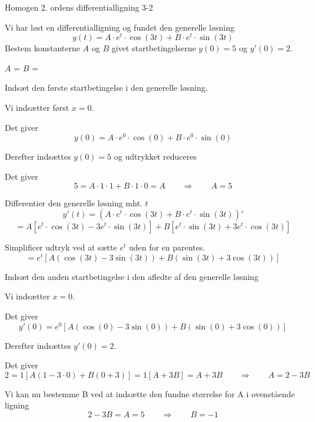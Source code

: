 \documentclass{article}
\begin{document}
\newpage

\begin{exercise}{Homogen 2. ordens differentialligning 3-2}

Vi har løst en differentialligning og fundet den generelle løsning
\[
y(t) = A \cdot e^{t} \cdot \cos(3 t)+ B \cdot e^{t} \cdot \sin(3 t)
\]
Bestem konstanterne $A$ og $B$ givet startbetingelserne $y(0)=5$ og $y'(0)=2$.


$A$ = 
$B$ = 

\hint

Indsæt den første startbetingelse i den generelle løsning.


\hint

Vi indsætter først $x=0$.

\hint

Det giver
\[
y(0)= A \cdot e^{0} \cdot \cos(0)+ B \cdot e^{0} \cdot \sin(0)
\]

\hint

Derefter indsættes $y(0)=5$ og udtrykket reduceres

\hint

Det giver
\[
5= A \cdot 1 \cdot 1+ B \cdot 1 \cdot 0 = A \qquad \Rightarrow \qquad A = 5
\]

\hint

Differentier den generelle løsning mht. $t$
\[
y'(t) = \left(A \cdot e^{ t} \cdot \cos(3 t)+ B \cdot e^{t} \cdot \sin(3t)\right)'
\]
\[
= A \left[e^{t} \cdot \cos(3t) - 3e^{t} \cdot \sin(3t) \right] + B \left[e^{t} \cdot \sin(3t) + 3e^{t} \cdot \cos(3t) \right]
\]

\hint

Simplificer udtryk ved at sætte $e^{t}$ uden for en parentes.
\[
= e^{t} \left[ A (\cos(3t)-3\sin(3t)) + B (\sin(3t) + 3\cos(3t)) \right]
\]

\hint

Indsæt den anden startbetingelse i den afledte af den generelle løsning

\hint

Vi indsætter $x=0$.

\hint

Det giver
\[
y'(0) = e^{0} \left[ A (\cos(0)-3 \sin(0)) + B (\sin(0) + 3 \cos(0)) \right]
\]

\hint

Derefter indsættes $y'(0)=2$.
\hint

Det giver
\[
2 = 1 \left[ A (1 - 3 \cdot 0) + B (0 + 3 ) \right] = 1 \left[ A + 3B \right] = A + 3B \qquad \Rightarrow \qquad A = 2 - 3B
\]

\hint

Vi kan nu bestemme B ved at indsætte den fundne størrelse for A i ovenstående ligning
\[
2 - 3B = A = 5 \qquad \Rightarrow \qquad B = -1
\]


\end{exercise}
\end{document}
